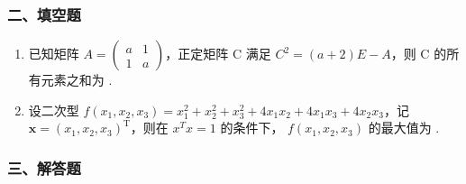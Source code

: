 \documentclass[12pt, a4paper]{ctexart}
\begin{document}
\subsubsection*{二、填空题}

\begin{enumerate}[start=7]
    \item 已知矩阵 $ A = \begin{pmatrix} a & 1 \\ 1 & a \end{pmatrix} $，正定矩阵 C 满足 $ C^{2} = (a + 2)E - A $，则 C 的所有元素之和为 \underline{\hspace{2cm}}.

    \item 设二次型 $ f(x_{1},x_{2},x_{3})=x_{1}^{2}+x_{2}^{2}+x_{3}^{2}+4x_{1}x_{2}+4x_{1}x_{3}+4x_{2}x_{3} $，记 $ \mathbf{x}=(x_{1},x_{2},x_{3})^{\mathrm{T}} $，则在 $ x^{T}x=1 $ 的条件下， $ f(x_{1},x_{2},x_{3}) $ 的最大值为 \underline{\hspace{2cm}}.
\end{enumerate}

\subsubsection*{三、解答题}
\end{document}
